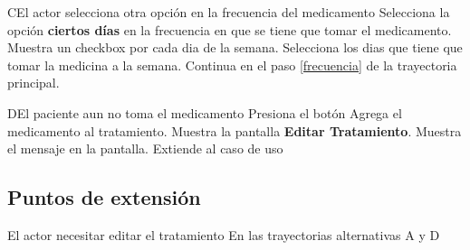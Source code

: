 \begin{UCtrayectoriaA}{C}{El actor selecciona otra opción en la frecuencia del medicamento}
	\UCpaso [\UCactor] Selecciona la opción \textbf{ciertos días} en la frecuencia en que se tiene que tomar el medicamento.
	\UCpaso Muestra un checkbox por cada dia de la semana.
	\UCpaso [\UCactor] Selecciona los dias que tiene que tomar la medicina a la semana.
	\UCpaso Continua en el paso \ref{frecuencia} de la trayectoria principal.
\end{UCtrayectoriaA}

\begin{UCtrayectoriaA}{D}{El paciente aun no toma el medicamento}
	\UCpaso [\UCactor] Presiona el botón 
	\UCpaso Agrega el medicamento al tratamiento.
	\UCpaso Muestra la pantalla \textbf{Editar Tratamiento}.
	\UCpaso Muestra el mensaje  en la pantalla.
	\UCpaso Extiende al caso de uso 
\end{UCtrayectoriaA}



\subsection{Puntos de extensión}

\UCExtensionPoint
{El actor necesitar editar el tratamiento}
{En las trayectorias alternativas A y D}
{}
